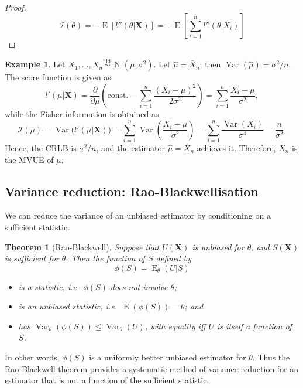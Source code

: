 \documentclass[
]{book}
\providecommand{\tightlist}{%
  \setlength{\itemsep}{0pt}\setlength{\parskip}{0pt}}
\newcommand{\bX}{{\boldsymbol X}}
\DeclareMathOperator{\E}{E}
\DeclareMathOperator{\Var}{Var}
\DeclareMathOperator{\N}{N}
\newcommand{\iid}{\,\overset{\text{iid}}{\sim}\,}
\newcommand{\cI}{{\mathcal I}}
\newcommand{\const}{\text{const.}}
\newtheorem{theorem}{Theorem}[chapter]
\theoremstyle{definition}
\theoremstyle{definition}
\newtheorem{example}{Example}[chapter]
\theoremstyle{definition}
\theoremstyle{definition}
\theoremstyle{remark}
\begin{document}
\begin{proof}
\[
\cI(\theta) = -\E[l''(\theta|\bX)] = -\E\left[\sum_{i=1}^n l''(\theta|X_i)\right]
\]
\end{proof}

\begin{example}
Let \(X_1,\dots,X_n\iid\N(\mu,\sigma^2)\). Let \(\hat\mu=\bar X_n\); then \(\Var(\hat\mu)=\sigma^2/n\). The score function is given as
\[
l'(\mu|\bX) = \frac{\partial}{\partial\mu} \left(\const - \sum_{i=1}^n \frac{(X_i-\mu)^2}{2\sigma^2} \right) = \sum_{i=1}^n \frac{X_i-\mu}{\sigma^2},
\]
while the Fisher information is obtained as
\[
\cI(\mu) = \Var\big(l'(\mu|\bX)\big) = \sum_{i=1}^n \Var\left(\frac{X_i-\mu}{\sigma^2} \right) = \sum_{i=1}^n\frac{\Var(X_i)}{\sigma^4} = \frac{n}{\sigma^2}.
\]
Hence, the CRLB is \(\sigma^2/n\), and the estimator \(\hat\mu=\bar X_n\) achieves it. Therefore, \(\bar X_n\) is the MVUE of \(\mu\).
\end{example}

\hypertarget{variance-reduction-rao-blackwellisation}{%
\subsection{Variance reduction: Rao-Blackwellisation}\label{variance-reduction-rao-blackwellisation}}

We can reduce the variance of an unbiased estimator by conditioning on a sufficient statistic.

\begin{theorem}[Rao-Blackwell]

Suppose that \(U(\bX)\) is unbiased for \(\theta\), and \(S(\bX)\) is sufficient for \(\theta\).
Then the function of \(S\) defined by
\[
\phi(S) = \E_\theta(U|S)
\]

\begin{itemize}
\tightlist
\item
  is a statistic, i.e.~\(\phi(S)\) does not involve \(\theta\);
\item
  is an unbiased statistic, i.e.~\(\E(\phi(S)) = \theta\); and
\item
  has \(\Var_\theta(\phi(S)) \leq \Var_\theta (U)\), with equality iff \(U\) is itself a function of \(S\).
\end{itemize}

\end{theorem}

In other words, \(\phi(S)\) is a uniformly better unbiased estimator for \(\theta\).
Thus the Rao-Blackwell theorem provides a systematic method of variance reduction for an estimator that is not a function of the sufficient statistic.
\end{document}
